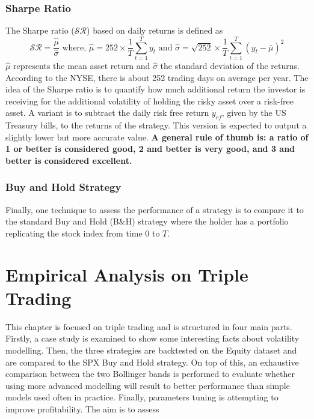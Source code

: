 \documentclass[11pt,a4,twosided,singlespacing,titlepagenumber=on]{scrreprt}
\numberwithin{equation}{chapter} %
\theoremstyle{remark}
\begin{document}
\subsection{Sharpe Ratio}
The Sharpe ratio ($\mathcal{SR}$) based on daily returns is defined as
\begin{equation}
\mathcal{SR} =  \frac{\hat{\mu}}{\hat{\sigma}} \text{ where, } \hat{\mu} =  252  \times \frac{1}{T} \sum_{t=1}^T y_t \text{ and } \hat{\sigma} = \sqrt{252} \times \frac{1}{T} \sum_{t=1}^T (y_t - \bar{\mu})^2 \label{sharpe_ratio_def}
\end{equation}
$\hat{\mu}$ represents the mean asset return and $\hat{\sigma}$ the standard deviation of the returns. According to the NYSE, there is about 252 trading days on average per year. The idea of the Sharpe ratio is to quantify how much additional return the investor is receiving for the additional volatility of holding the risky asset over a risk-free asset. A variant is to subtract the daily risk free return $y_{rf}$, given by the US Treasury bills, to the returns of the strategy. This version is expected to output a slightly lower but more accurate value. \textbf{A general rule of thumb is: a ratio of 1 or better is considered good, 2 and better is very good, and 3 and better is considered excellent.} \\

\subsection{Buy and Hold Strategy}
Finally, one technique to assess the performance of a strategy is to compare it to the standard Buy and Hold (B\&H) strategy where the holder has a portfolio replicating the stock index from time 0 to $T$.

\chapter{Empirical Analysis on Triple Trading}
This chapter is focused on triple trading and is structured in four main parts. Firstly, a case study is examined to show some interesting facts about volatility modelling. Then, the three strategies are backtested on the Equity dataset and are compared to the SPX Buy and Hold strategy. On top of this, an exhaustive comparison between the two Bollinger bands is performed to evaluate whether using more advanced modelling will result to better performance than simple models used often in practice. Finally, parameters tuning is attempting to improve profitability. The aim is to assess  
\end{document}
